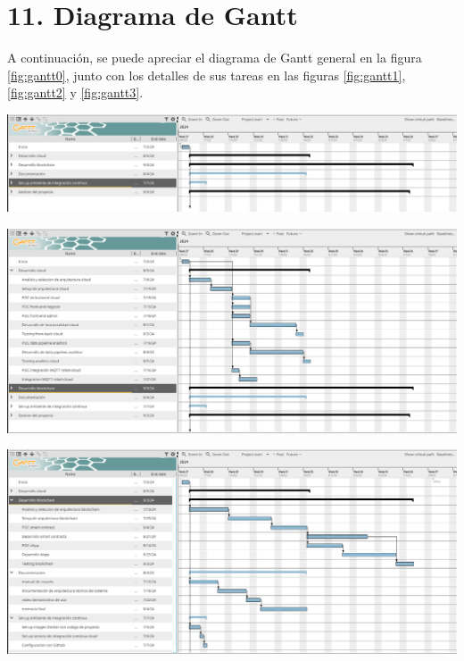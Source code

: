\documentclass[
11pt, %
]{charter}
\begin{document}
\section{11. Diagrama de Gantt}
\label{sec:gantt}

A continuación, se puede apreciar el diagrama de Gantt general en la figura \ref{fig:gantt0}, junto con los detalles de sus tareas en las figuras \ref{fig:gantt1}, \ref{fig:gantt2} y \ref{fig:gantt3}.

\begin{center}
 \includegraphics[scale=0.28]{Figuras/gantt-0}
 \label{fig:gantt0}
\end{center}

\begin{center}
 \includegraphics[scale=0.28]{Figuras/gantt-1}
 \label{fig:gantt1}
\end{center}

\begin{center}
 \includegraphics[scale=0.28]{Figuras/gantt-2}
 \label{fig:gantt2}
\end{center}
\end{document}
